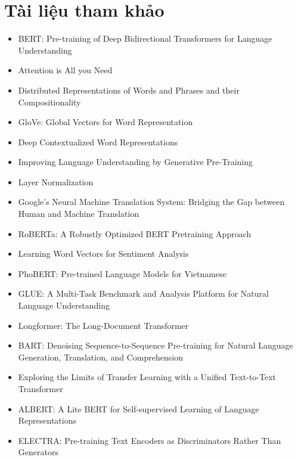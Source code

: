 \section{Tài liệu tham khảo}

\begin{itemize}
    \item {BERT: Pre-training of Deep Bidirectional Transformers for Language Understanding} \cite{devlin2018bert}
    \item {Attention is All you Need} \cite{vaswani2017attention}
    \item {Distributed Representations of Words and Phrases and their Compositionality} \cite{mikolov2013distributed}
    \item {GloVe: Global Vectors for Word Representation} \cite{pennington2014glove}
    \item {Deep Contextualized Word Representations} \cite{peters2018deep}
    \item {Improving Language Understanding by Generative Pre-Training} \cite{radford2018improving}
    \item {Layer Normalization} \cite{ba2016layer}
    \item {Google's Neural Machine Translation System: Bridging the Gap between Human and Machine Translation} \cite{wu2016google}
    \item {RoBERTa: A Robustly Optimized BERT Pretraining Approach} \cite{liu2019roberta}
    \item {Learning Word Vectors for Sentiment Analysis} \cite{maas2011learning}
    \item {PhoBERT: Pre-trained Language Models for Vietnamese} \cite{nguyen2020phobert}
    \item {GLUE: A Multi-Task Benchmark and Analysis Platform for Natural Language Understanding} \cite{wang2018glue}
    \item {Longformer: The Long-Document Transformer} \cite{beltagy2020longformer}
    \item {BART: Denoising Sequence-to-Sequence Pre-training for Natural Language Generation, Translation, and Comprehension} \cite{lewis2019bart}
    \item {Exploring the Limits of Transfer Learning with a Unified Text-to-Text Transformer} \cite{raffel2020exploring}
    \item {ALBERT: A Lite BERT for Self-supervised Learning of Language Representations} \cite{lan2019albert}
    \item {ELECTRA: Pre-training Text Encoders as Discriminators Rather Than Generators} \cite{clark2020electra}

\end{itemize}
